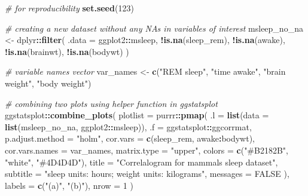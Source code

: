\documentclass[
]{article}
\newenvironment{Shaded}{\begin{snugshade}}{\end{snugshade}}
\newcommand{\CommentTok}[1]{\textcolor[rgb]{0.56,0.35,0.01}{\textit{#1}}}
\newcommand{\DataTypeTok}[1]{\textcolor[rgb]{0.13,0.29,0.53}{#1}}
\newcommand{\DecValTok}[1]{\textcolor[rgb]{0.00,0.00,0.81}{#1}}
\newcommand{\KeywordTok}[1]{\textcolor[rgb]{0.13,0.29,0.53}{\textbf{#1}}}
\newcommand{\NormalTok}[1]{#1}
\newcommand{\OperatorTok}[1]{\textcolor[rgb]{0.81,0.36,0.00}{\textbf{#1}}}
\newcommand{\OtherTok}[1]{\textcolor[rgb]{0.56,0.35,0.01}{#1}}
\newcommand{\StringTok}[1]{\textcolor[rgb]{0.31,0.60,0.02}{#1}}
\begin{document}
\begin{Shaded}
\begin{Highlighting}[]
\CommentTok{\# for reproducibility}
\KeywordTok{set.seed}\NormalTok{(}\DecValTok{123}\NormalTok{)}

\CommentTok{\# creating a new dataset without any NAs in variables of interest}
\NormalTok{msleep\_no\_na \textless{}{-}}
\StringTok{  }\NormalTok{dplyr}\OperatorTok{::}\KeywordTok{filter}\NormalTok{(}
    \DataTypeTok{.data =}\NormalTok{ ggplot2}\OperatorTok{::}\NormalTok{msleep,}
    \OperatorTok{!}\KeywordTok{is.na}\NormalTok{(sleep\_rem), }\OperatorTok{!}\KeywordTok{is.na}\NormalTok{(awake), }\OperatorTok{!}\KeywordTok{is.na}\NormalTok{(brainwt), }\OperatorTok{!}\KeywordTok{is.na}\NormalTok{(bodywt)}
\NormalTok{  )}

\CommentTok{\# variable names vector}
\NormalTok{var\_names \textless{}{-}}\StringTok{ }\KeywordTok{c}\NormalTok{(}\StringTok{"REM sleep"}\NormalTok{, }\StringTok{"time awake"}\NormalTok{, }\StringTok{"brain weight"}\NormalTok{, }\StringTok{"body weight"}\NormalTok{)}

\CommentTok{\# combining two plots using helper function in \textasciigrave{}ggstatsplot\textasciigrave{}}
\NormalTok{ggstatsplot}\OperatorTok{::}\KeywordTok{combine\_plots}\NormalTok{(}
  \DataTypeTok{plotlist =}\NormalTok{ purrr}\OperatorTok{::}\KeywordTok{pmap}\NormalTok{(}
    \DataTypeTok{.l =} \KeywordTok{list}\NormalTok{(}\DataTypeTok{data =} \KeywordTok{list}\NormalTok{(msleep\_no\_na, ggplot2}\OperatorTok{::}\NormalTok{msleep)),}
    \DataTypeTok{.f =}\NormalTok{ ggstatsplot}\OperatorTok{::}\NormalTok{ggcorrmat,}
    \DataTypeTok{p.adjust.method =} \StringTok{"holm"}\NormalTok{,}
    \DataTypeTok{cor.vars =} \KeywordTok{c}\NormalTok{(sleep\_rem, awake}\OperatorTok{:}\NormalTok{bodywt),}
    \DataTypeTok{cor.vars.names =}\NormalTok{ var\_names,}
    \DataTypeTok{matrix.type =} \StringTok{"upper"}\NormalTok{,}
    \DataTypeTok{colors =} \KeywordTok{c}\NormalTok{(}\StringTok{"\#B2182B"}\NormalTok{, }\StringTok{"white"}\NormalTok{, }\StringTok{"\#4D4D4D"}\NormalTok{),}
    \DataTypeTok{title =} \StringTok{"Correlalogram for mammals sleep dataset"}\NormalTok{,}
    \DataTypeTok{subtitle =} \StringTok{"sleep units: hours; weight units: kilograms"}\NormalTok{,}
    \DataTypeTok{messages =} \OtherTok{FALSE}
\NormalTok{  ),}
  \DataTypeTok{labels =} \KeywordTok{c}\NormalTok{(}\StringTok{"(a)"}\NormalTok{, }\StringTok{"(b)"}\NormalTok{),}
  \DataTypeTok{nrow =} \DecValTok{1}
\NormalTok{)}
\end{Highlighting}
\end{Shaded}
\end{document}
